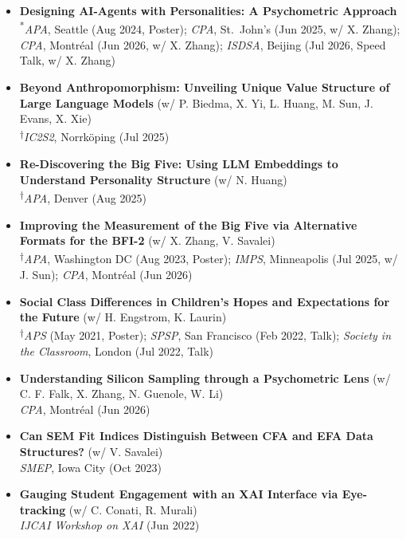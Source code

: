 \documentclass[11pt,letterpaper]{article}
\begin{document}
\vspace{0.3em}
\begin{itemize}[itemsep=2pt]
    \item \textbf{Designing AI-Agents with Personalities: A Psychometric Approach}\\
    {\scriptsize \textsuperscript{*}\textit{APA}, Seattle (Aug 2024, Poster); \textit{CPA}, St.\ John's (Jun 2025, w/ X. Zhang); \textit{CPA}, Montréal (Jun 2026, w/ X. Zhang); \textit{ISDSA}, Beijing (Jul 2026, Speed Talk, w/ X. Zhang)}
    \item \textbf{Beyond Anthropomorphism: Unveiling Unique Value Structure of Large Language Models} (w/ P. Biedma, X. Yi, L. Huang, M. Sun, J. Evans, X. Xie)\\
    {\scriptsize \textsuperscript{$\dagger$}\textit{IC2S2}, Norrköping (Jul 2025)}
    \item \textbf{Re-Discovering the Big Five: Using LLM Embeddings to Understand Personality Structure} (w/ N. Huang)\\
    {\scriptsize \textsuperscript{$\dagger$}\textit{APA}, Denver (Aug 2025)}
    \item \textbf{Improving the Measurement of the Big Five via Alternative Formats for the BFI-2} (w/ X. Zhang, V. Savalei)\\
    {\scriptsize \textsuperscript{$\dagger$}\textit{APA}, Washington DC (Aug 2023, Poster); \textit{IMPS}, Minneapolis (Jul 2025, w/ J. Sun); \textit{CPA}, Montréal (Jun 2026)}
    \item \textbf{Social Class Differences in Children's Hopes and Expectations for the Future} (w/ H. Engstrom, K. Laurin)\\
    {\scriptsize \textsuperscript{$\dagger$}\textit{APS} (May 2021, Poster); \textit{SPSP}, San Francisco (Feb 2022, Talk); \textit{Society in the Classroom}, London (Jul 2022, Talk)}
    \item \textbf{Understanding Silicon Sampling through a Psychometric Lens} (w/ C. F. Falk, X. Zhang, N. Guenole, W. Li)\\
    {\scriptsize \textit{CPA}, Montréal (Jun 2026)}
    \item \textbf{Can SEM Fit Indices Distinguish Between CFA and EFA Data Structures?} (w/ V. Savalei)\\
    {\scriptsize \textit{SMEP}, Iowa City (Oct 2023)}
    \item \textbf{Gauging Student Engagement with an XAI Interface via Eye-tracking} (w/ C. Conati, R. Murali)\\
    {\scriptsize \textit{IJCAI Workshop on XAI} (Jun 2022)}
\end{itemize}
\end{document}
